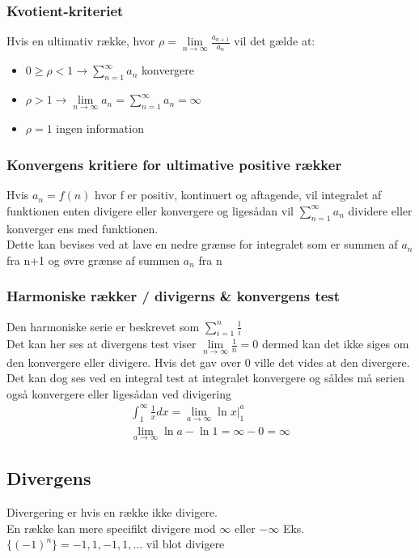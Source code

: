 \documentclass[12pt, a4paper]{article}
\begin{document}
		\subsubsection{Kvotient-kriteriet}
			Hvis en ultimativ række, hvor $\rho=\lim\limits_{n\rightarrow\infty}\frac{a_{n+1}}{a_n}$ vil det gælde at:
			\begin{itemize}
				\item $0\geq \rho < 1 \rightarrow \sum\limits_{n=1}^{\infty}a_n$ konvergere
				\item $\rho > 1 \rightarrow \lim\limits_{n\rightarrow \infty}a_n=\sum\limits_{n=1}^{\infty}a_n=\infty$
				\item $\rho = 1$ ingen information
			\end{itemize}
		\subsubsection{Konvergens kritiere for ultimative positive rækker}
		Hvis $a_n=f(n)$ hvor f er positiv, kontinuert og aftagende, vil integralet af funktionen enten divigere eller konvergere og ligesådan vil $\sum\limits_{n=1}^{\infty}a_n$ dividere eller konverger ens med funktionen.\\
		Dette kan bevises ved at lave en nedre grænse for integralet som er summen af $a_n$ fra n+1 og øvre grænse af summen $a_n$ fra n\\
		\subsubsection{Harmoniske rækker / divigerns \& konvergens test}
			Den harmoniske serie er beskrevet som $\sum\limits_{i=1}^n\frac{1}{i}$\\
			Det kan her ses at divergens test viser $\lim\limits_{n\rightarrow \infty}\frac{1}{n}=0$ dermed kan det ikke siges om den konvergere eller divigere. Hvis det gav over 0 ville det vides at den divergere.\\
			Det kan dog ses ved en integral test at integralet konvergere og såldes må serien også konvergere eller ligesådan ved divigering\\
			\begin{align*}
				\int_1^{\infty}\frac{1}{x}dx=\lim\limits_{a\rightarrow \infty}\ln x|^a_1\\
				\lim\limits_{a\rightarrow \infty}\ln a-\ln 1 = \infty - 0 = \infty
			\end{align*}
	\subsection{Divergens}
		Divergering er hvis en række ikke divigere.\\
		En række kan mere specifikt divigere mod $\infty$ eller $-\infty$
		Eks. $\{(-1)^n\}=-1,1,-1,1,...$ vil blot divigere
\end{document}

